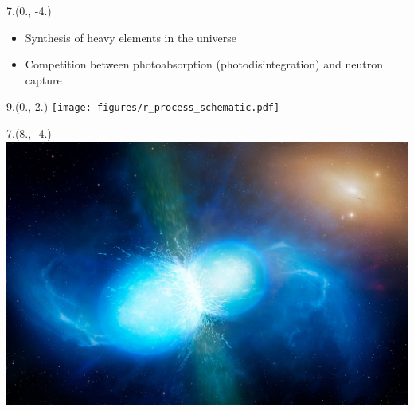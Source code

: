 \begin{textblock}{7.}(0., -4.)
    \begin{itemize}
        \item Synthesis of heavy elements in the universe
        \item Competition between photoabsorption (photodisintegration) and neutron capture
    \end{itemize}
\end{textblock}

\begin{textblock}{9.}(0., 2.)
    \texttt{[image: figures/r\_process\_schematic.pdf]}
\end{textblock}

\begin{textblock}{7.}(8., -4.)
    \includegraphics[width=\textwidth]{figures/neutron_star_merger.jpg}
\end{textblock}